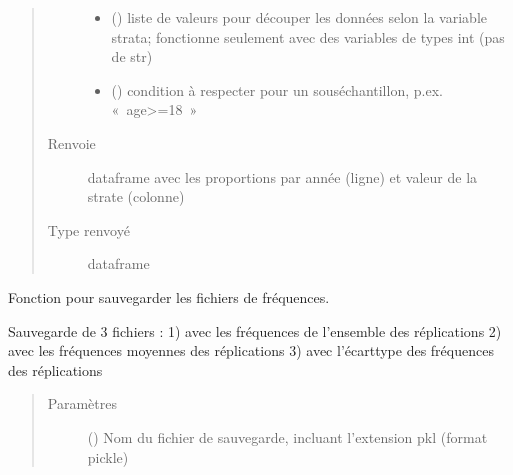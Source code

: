 \documentclass[letterpaper,10pt,french]{sphinxmanual}
\begin{document}
\begin{fulllineitems}
\begin{fulllineitems}
\begin{quote}
\begin{description}
\begin{itemize}
\item {} 
 () \textendash{} liste de valeurs pour découper les données selon la variable strata; fonctionne seulement avec des variables de types int (pas de str)

\item {} 
 () \textendash{} condition à respecter pour un sous\sphinxhyphen{}échantillon, p.ex. « age\textgreater{}=18 »

\end{itemize}

\item[{Renvoie}] \leavevmode
dataframe avec les proportions par année (ligne) et valeur de la strate (colonne)

\item[{Type renvoyé}] \leavevmode
dataframe

\end{description}\end{quote}

\end{fulllineitems}


\begin{fulllineitems}
\label{\detokenize{code:simgen.replicate.save}}
Fonction pour sauvegarder les fichiers de fréquences.

Sauvegarde de 3 fichiers : 1)  avec les fréquences de l’ensemble des réplications 2)  avec les fréquences moyennes des réplications 3)  avec l’écart\sphinxhyphen{}type des fréquences des réplications
\begin{quote}\begin{description}
\item[{Paramètres}] \leavevmode
{} () \textendash{} Nom du fichier de sauvegarde, incluant l’extension pkl (format pickle)

\end{description}\end{quote}

\end{fulllineitems}


\end{fulllineitems}
\end{document}

